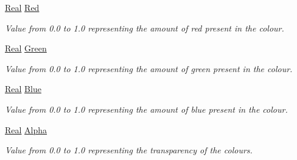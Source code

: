 \begin{DoxyCompactItemize}
\item 
\hypertarget{classphys_1_1ColourValue_a32b5411b9b87f92a6626f3f4d5f0a158}{
\hyperlink{namespacephys_af7eb897198d265b8e868f45240230d5f}{Real} \hyperlink{classphys_1_1ColourValue_a32b5411b9b87f92a6626f3f4d5f0a158}{Red}}
\label{d3/db0/classphys_1_1ColourValue_a32b5411b9b87f92a6626f3f4d5f0a158}

\begin{DoxyCompactList}\small\item\em Value from 0.0 to 1.0 representing the amount of red present in the colour. \item\end{DoxyCompactList}\item 
\hypertarget{classphys_1_1ColourValue_adea93a8cd64acc8b5fd1851b4460af00}{
\hyperlink{namespacephys_af7eb897198d265b8e868f45240230d5f}{Real} \hyperlink{classphys_1_1ColourValue_adea93a8cd64acc8b5fd1851b4460af00}{Green}}
\label{d3/db0/classphys_1_1ColourValue_adea93a8cd64acc8b5fd1851b4460af00}

\begin{DoxyCompactList}\small\item\em Value from 0.0 to 1.0 representing the amount of green present in the colour. \item\end{DoxyCompactList}\item 
\hypertarget{classphys_1_1ColourValue_a403503f979575b17d1873f031e8d7d75}{
\hyperlink{namespacephys_af7eb897198d265b8e868f45240230d5f}{Real} \hyperlink{classphys_1_1ColourValue_a403503f979575b17d1873f031e8d7d75}{Blue}}
\label{d3/db0/classphys_1_1ColourValue_a403503f979575b17d1873f031e8d7d75}

\begin{DoxyCompactList}\small\item\em Value from 0.0 to 1.0 representing the amount of blue present in the colour. \item\end{DoxyCompactList}\item 
\hypertarget{classphys_1_1ColourValue_a5fc5eceef739a91d7cc079767d712f52}{
\hyperlink{namespacephys_af7eb897198d265b8e868f45240230d5f}{Real} \hyperlink{classphys_1_1ColourValue_a5fc5eceef739a91d7cc079767d712f52}{Alpha}}
\label{d3/db0/classphys_1_1ColourValue_a5fc5eceef739a91d7cc079767d712f52}

\begin{DoxyCompactList}\small\item\em Value from 0.0 to 1.0 representing the transparency of the colours. \item\end{DoxyCompactList}\end{DoxyCompactItemize}


